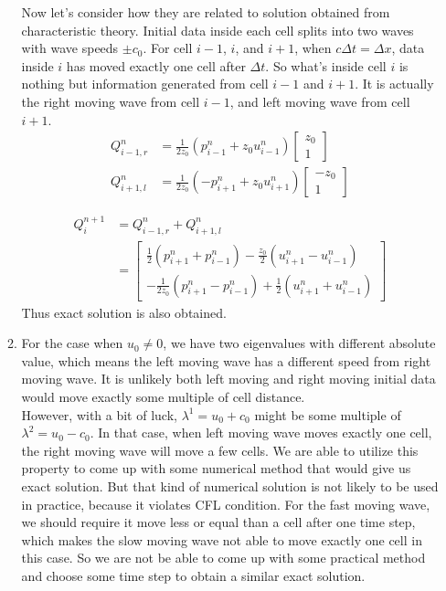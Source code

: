 \documentclass[11pt]{article}
\begin{document}
\begin{enumerate}
\begin{enumerate}
					Now let's consider how they are related to solution obtained from characteristic theory. Initial data inside each cell splits into two waves with wave speeds $\pm c_0$. For cell $i-1$, $i$, and $i+1$, when $c\Delta t=\Delta x$, data inside $i$ has moved exactly one cell after $\Delta t$. So what's inside cell $i$ is nothing but information generated from cell $i-1$ and $i+1$. It is actually the right moving wave from cell $i-1$, and left moving wave from cell $i+1$.
					\begin{align*}
					Q_{i-1,r}^n &= \frac{1}{2z_0}(p_{i-1}^n+z_0u_{i-1}^n)
					\begin{bmatrix}z_0\\1\end{bmatrix}\\
					Q_{i+1,l}^n &= \frac{1}{2z_0}(-p_{i+1}^n+z_0u_{i+1}^n)
					\begin{bmatrix}-z_0\\1\end{bmatrix}
					\end{align*}
				
					\begin{align*}
					Q_i^{n+1} &=Q_{i-1,r}^n+Q_{i+1,l}^n\\
					 &=\begin{bmatrix}
					\frac{1}{2}(p_{i+1}^n+p_{i-1}^n)-\frac{z_0}{2}(u_{i+1}^n-u_{i-1}^n)\\
					-\frac{1}{2z_0}(p_{i+1}^n-p_{i-1}^n)+\frac{1}{2}(u_{i+1}^n+u_{i-1}^n)
					\end{bmatrix}
					\end{align*}
					Thus exact solution is also obtained.
				
				\item
					For the case when $u_0\neq 0$, we have two eigenvalues with different absolute value, which means the left moving wave has a different speed from right moving wave. It is unlikely both left moving and right moving initial data would move exactly some multiple of cell distance.\\
					
					However, with a bit of luck, $\lambda^1 = u_0+c_0$ might be some multiple of $\lambda^2 = u_0-c_0$. In that case, when left moving wave moves exactly one cell, the right moving wave will move a few cells. We are able to utilize this property to come up with some numerical method that would give us exact solution. But that kind of numerical solution is not likely to be used in practice, because it violates CFL condition. For the fast moving wave, we should require it move less or equal than a cell after one time step, which makes the slow moving wave not able to move exactly one cell in this case. So we are not be able to come up with some practical method and choose some time step to obtain a similar exact solution.
				        	

\end{enumerate}
\end{enumerate}
\end{document}
